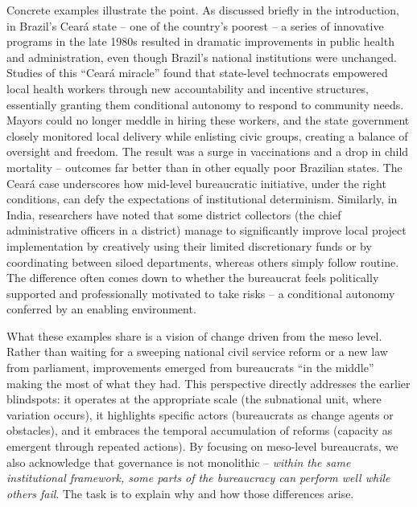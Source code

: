 Concrete examples illustrate the point. As discussed briefly in the introduction, in Brazil’s Ceará state
– one of the country’s poorest – a series of innovative programs in the late 1980s resulted in dramatic
improvements in public health and administration, even though Brazil’s national institutions were
unchanged. Studies of this “Ceará miracle” found that state-level technocrats empowered local health
workers through new accountability and incentive structures, essentially granting them conditional
autonomy to respond to community needs. Mayors could no longer meddle in hiring these workers, and
the state government closely monitored local delivery while enlisting civic groups, creating a balance
of oversight and freedom. The result was a surge in vaccinations and a drop in child mortality – outcomes
far better than in other equally poor Brazilian states. The Ceará case underscores how mid-level
bureaucratic initiative, under the right conditions, can defy the expectations of institutional determinism.
Similarly, in India, researchers have noted that some district collectors (the chief administrative officers
in a district) manage to significantly improve local project implementation by creatively using their
limited discretionary funds or by coordinating between siloed departments, whereas others simply
follow routine. The difference often comes down to whether the bureaucrat feels politically supported
and professionally motivated to take risks – a conditional autonomy conferred by an enabling
environment.

What these examples share is a vision of change driven from the meso level. Rather than waiting for a
sweeping national civil service reform or a new law from parliament, improvements emerged from
bureaucrats “in the middle” making the most of what they had. This perspective directly addresses the
earlier blindspots: it operates at the appropriate scale (the subnational unit, where variation occurs), it
highlights specific actors (bureaucrats as change agents or obstacles), and it embraces the temporal
accumulation of reforms (capacity as emergent through repeated actions). By focusing on meso-level
bureaucrats, we also acknowledge that governance is not monolithic – \textit{within the same institutional
framework, some parts of the bureaucracy can perform well while others fail}. The task is to explain why
and how those differences arise.


